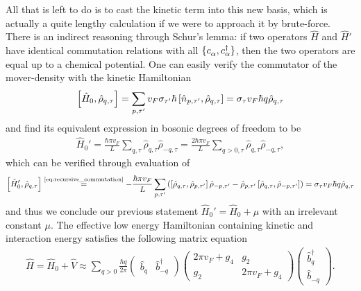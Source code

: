 All that is left to do is to cast the kinetic term into this new basis, which is actually a quite lengthy calculation if we were to approach it by brute-force.
There is an indirect reasoning through Schur's lemma: if two operators $\hat H$ and $\hat H'$ have identical commutation relations with all $\{c^\pdag_\alpha,c^\dag_\alpha\}$, then the two operators are equal up to a chemical potential.
One can easily verify the commutator of the mover-density with the kinetic Hamiltonian
\begin{align}
    \left[ \hat H_0, \hat\rho_{q,\tau} \right]
    =
    \sum_{p,\tau'}v_F\sigma_{\tau'}\hbar \left[ \hat n_{p,\tau'},\hat\rho_{q,\tau} \right]
    =
    \sigma_\tau v_F \hbar q \hat\rho_{q,\tau}
\end{align}
and find its equivalent expression in bosonic degrees of freedom to be
\begin{align}
    \hat H_0' = \frac{\hbar \pi v_F}L\sum_{q,\tau}\hat\rho_{q,\tau}\hat\rho_{-q,\tau} = \frac{2\hbar\pi v_F}L\sum_{q>0,\tau}\hat\rho_{q,\tau}\hat\rho_{-q,\tau},
\end{align}
which can be verified through evaluation of
\begin{align}
    \commutator{\hat H_0',\hat\rho_{q,\tau}}
    \overset{\text{\cref{eq:recursive_commutation}}}{=}
    -\frac{\hbar \pi v_F}L
    \sum_{p,\tau'}
    \brlr{
    \commutator{\hat\rho_{q,\tau},\hat\rho_{p,\tau'}}\hat\rho_{-p,\tau'}
    -
    \hat\rho_{p,\tau'}\commutator{\hat\rho_{q,\tau},\hat\rho_{-p,\tau'}}
    }
    =
    \sigma_\tau v_F \hbar q\hat\rho_{q,\tau}
\end{align}
and thus we conclude our previous statement $\hat H_0' = \hat H_0 + \mu$ with an irrelevant constant $\mu$.
The effective low energy Hamiltonian containing kinetic and interaction energy satisfies the following matrix equation
\begin{align}
    \hat H = \hat H_0 + \hat V \approx
    \sum_{q>0}\frac{\hbar q}{2\pi}
    \begin{pmatrix}
        \hat b_q & \hat b^\dag_{-q}
    \end{pmatrix}
    \begin{pmatrix}
        2\pi v_F + g_4 & g_2 \\
        g_2 & 2\pi v_F + g_4
    \end{pmatrix}
    \begin{pmatrix}
        \hat b^\dag_q \\ \hat b_{-q}
    \end{pmatrix}
    .
    \label{eq:luttinger_hamiltonian_nondiagonal}
\end{align}
